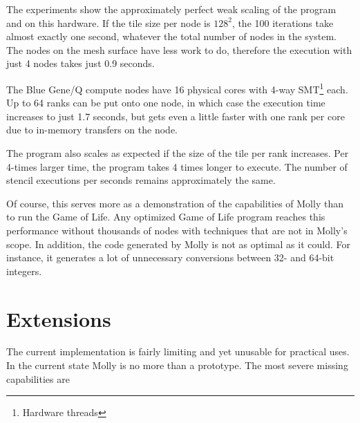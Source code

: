 \documentclass{sigplanconf}
\begin{document}
The experiments show the approximately perfect weak scaling of the program and on this hardware. If the tile size per node is $128^2$, the 100 iterations take almost exactly one second, whatever the total number of nodes in the system. The nodes on the mesh surface have less work to do, therefore the execution with just 4 nodes takes just 0.9 seconds.

The Blue Gene/Q compute nodes have 16 physical cores with 4-way SMT\footnote{Hardware threads} each. Up to 64 ranks can be put onto one node, in which case the execution time increases to just 1.7 seconds, but gets even a little faster with one rank per core due to in-memory transfers on the node.

The program also scales as expected if the size of the tile per rank increases. Per 4-times larger time, the program takes 4 times longer to execute. The number of stencil executions per seconds remains approximately the same.

Of course, this serves more as a demonstration of the capabilities of Molly than to run the Game of Life. Any optimized Game of Life program reaches this performance without thousands of nodes with techniques that are not in Molly's scope. In addition, the code generated by Molly is not as optimal as it could. For instance, it generates a lot of unnecessary conversions between 32- and 64-bit integers.



\section{Extensions}\label{sct:extensions}

The current implementation is fairly limiting and yet unusable for practical uses. In the current state Molly is no more than a prototype. The most severe missing capabilities are
\end{document}

